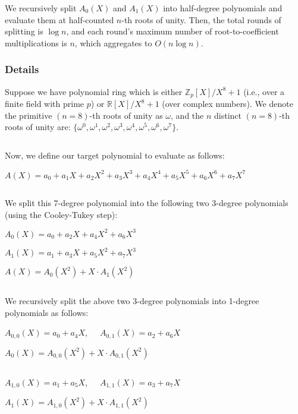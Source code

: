 We recursively split $A_0(X)$ and $A_1(X)$ into half-degree polynomials and evaluate them at half-counted $n$-th roots of unity. Then, the total rounds of splitting is $\log n$, and each round's maximum number of root-to-coefficient multiplications is $n$, which aggregates to $O(n \log n)$. 

\subsubsection{Details}
\label{subsec:ntt-forward-details}

Suppose we have polynomial ring which is either $\mathbb{Z}_{p}[X] / X^8 + 1$ (i.e., over a finite field with prime $p$) or $\mathbb{R}[X] / X^8 + 1$ (over complex numbers). 
We denote the primitive $(n=8)$-th roots of unity as $\omega$, and 
the $n$ distinct $(n=8)$-th roots of unity are: $\{\omega^0, \omega^1, \omega^2, \omega^3, \omega^4, \omega^5, \omega^6, \omega^7\}$.

$ $

Now, we define our target polynomial to evaluate as follows: 

$A(X) = a_0 + a_1X + a_2X^2 + a_3X^3 + a_4X^4 + a_5X^5 + a_6X^6 + a_7X^7$

$ $

We split this 7-degree polynomial into the following two 3-degree polynomials (using the Cooley-Tukey step): 

$A_0(X) = a_0 + a_2X + a_4X^2 + a_6X^3$

$A_1(X) = a_1 + a_3X + a_5X^2 + a_7X^3$

$A(X) = A_0(X^2) + X \cdot A_1(X^2)$

$ $

We recursively split the above two 3-degree polynomials into 1-degree polynomials as follows:


$A_{0,0}(X) = a_0 + a_4X$, \textcolor{white}{...} $A_{0,1}(X) = a_2 + a_6X$

$A_0(X) = A_{0,0}(X^2) + X\cdot A_{0,1}(X^2)$

$ $

$A_{1,0}(X) = a_1 + a_5X$, \textcolor{white}{...} $A_{1,1}(X) = a_3 + a_7X$

$A_1(X) = A_{1,0}(X^2) + X\cdot A_{1,1}(X^2)$

$ $

